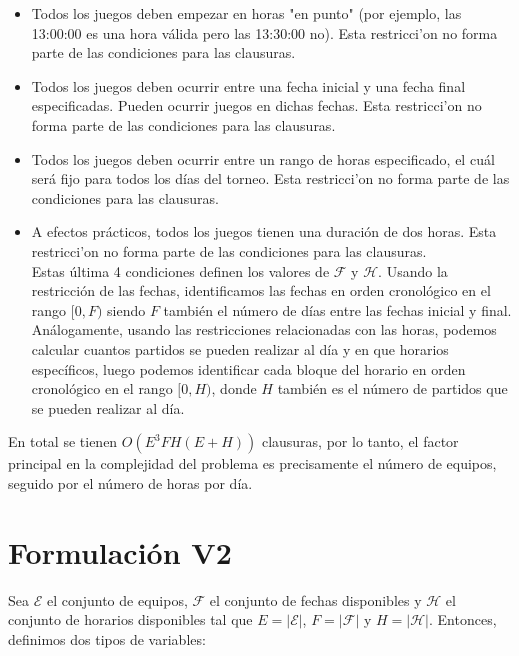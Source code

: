 \documentclass[a4paper,10pt]{article}
\begin{document}
\begin{itemize}
      \item Todos los juegos deben empezar en horas "en punto" (por ejemplo, 
      las 13:00:00 es una hora válida pero las 13:30:00 no). Esta restricci'on
      no forma parte de las condiciones para las clausuras.

      \item Todos los juegos deben ocurrir entre una fecha inicial y una fecha final 
      especificadas. Pueden ocurrir juegos en dichas fechas. Esta restricci'on
      no forma parte de las condiciones para las clausuras.

      \item Todos los juegos deben ocurrir entre un rango de horas especificado, el 
      cuál será fijo para todos los días del torneo. Esta restricci'on no forma 
      parte de las condiciones para las clausuras.

      \item A efectos prácticos, todos los juegos tienen una duración de dos horas.
      Esta restricci'on no forma parte de las condiciones para las clausuras.\\
      
      Estas \'ultima 4 condiciones definen los valores de $\mathcal{F}$ y 
      $\mathcal{H}$. Usando la restricci\'on de las fechas, identificamos las 
      fechas en orden cronol\'ogico en el rango $[0,F)$ siendo $F$ tambi\'en el 
      n\'umero de d\'ias entre las fechas inicial y final. An\'alogamente, usando 
      las restricciones relacionadas con las horas, podemos calcular cuantos 
      partidos se pueden realizar al d\'ia y en que horarios espec\'ificos, luego 
      podemos identificar cada bloque del horario en orden cronol\'ogico en el 
      rango $[0, H)$, donde $H$ tambi\'en es el n\'umero de partidos que se pueden 
      realizar al d\'ia.
    \end{itemize}

    En total se tienen $O(E^3FH(E + H))$ clausuras, por lo tanto, el factor principal
    en la complejidad del problema es precisamente el n\'umero de equipos, seguido 
    por el n\'umero de horas por d\'ia.

\section{Formulaci\'on V2}  
  Sea $\mathcal{E}$ el conjunto de equipos, $\mathcal{F}$ el conjunto de fechas 
  disponibles y $\mathcal{H}$ el conjunto de horarios disponibles tal que 
  $E = |\mathcal{E}|$, $F = |\mathcal{F}|$ y $H = |\mathcal{H}|$. Entonces, 
  definimos dos tipos de variables: 
\end{document}
